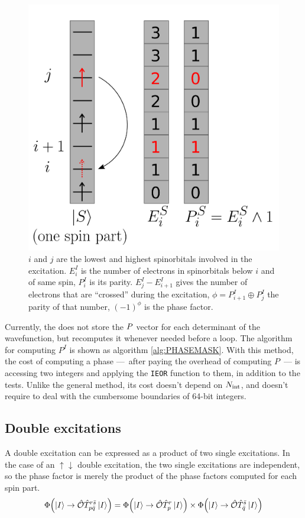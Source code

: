 \documentclass[./thesis.tex]{subfiles}
\begin{document}
                
\begin{figure}[h!]
	\begin{center}
		\includegraphics[width=0.5\columnwidth]{figures/determinant_driven/phase}
		\caption[phase mask illustration]{
		$i$ and $j$ are the lowest and highest spinorbitals involved in the excitation. $E_i^I$ is the number of electrons in spinorbitals below $i$ and of same spin, $P_i^I$ is its parity. $E_j^I - E_{i+1}^I$ gives the number of electrons that are ``crossed'' during the excitation, $\phi = P^I_{i+1} \oplus P^I_j$ the parity of that number, $(-1)^\phi$ is the phase factor.
		}
		\label{generators_selectors}
	\end{center}
\end{figure}


Currently, the \QP does not store the ${{{P}}}$ vector for each determinant of the wavefunction, but recomputes it whenever needed before a loop.
The algorithm for computing $P^I$ is shown as algorithm \ref{alg:PHASEMASK}. 
With this method, the cost of computing a phase ---~after paying the overhead of computing $P$~--- is accessing two integers and applying the \lstinline{IEOR} function to them, in addition to the tests. Unlike the general method, its cost doesn't depend on ${N_\text{int}}$, and doesn't require to deal with the cumbersome boundaries of 64-bit integers.



\subsection{Double excitations}


A double excitation can be expressed as a product of two single excitations.
In the case of an $\uparrow \downarrow$ double excitation, the two single excitations are independent, so the phase factor is merely the product of the phase factors computed for each spin part. 
\begin{equation}
{\Phi \qty(\ket{I} \rightarrow {\hat{\mathcal{O}}}{\hat{T}_{p \bar q}^{r \bar s}} \ket{I})} = 
{\Phi \qty(\ket{I} \rightarrow {\hat{\mathcal{O}}} {\hat{T}_{p}^{r}} \ket{I})} \times
{\Phi \qty(\ket{I} \rightarrow {\hat{\mathcal{O}}}{\hat{T}_{\bar q}^{\bar s}} \ket{I})} 
\end{equation}
\end{document}
